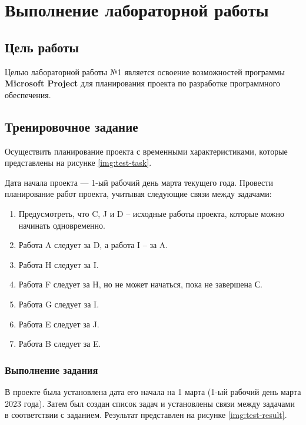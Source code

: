 
\chapter{Выполнение лабораторной работы}


\section{Цель работы}

Целью лабораторной работы №1 является освоение возможностей программы \textbf{Microsoft Project} для планирования проекта по разработке программного обеспечения.



\section{Тренировочное задание}

Осуществить планирование проекта с временными характеристиками, которые представлены на рисунке \ref{img:test-task}.


Дата начала проекта --- 1-ый рабочий день марта текущего года. Провести планирование работ проекта, учитывая следующие связи между задачами:

\begin{enumerate}
    \item Предусмотреть, что C, J и D – исходные работы проекта, которые можно
    начинать одновременно.
    \item Работа A следует за D, а работа I – за A.
    \item Работа H следует за I.
    \item Работа F следует за H, но не может начаться, пока не завершена С.
    \item Работа G следует за I.
    \item Работа E следует за J.
    \item Работа B следует за E.
\end{enumerate}


\subsection{Выполнение задания}

В проекте была установлена дата его начала на 1 марта (1-ый рабочий день марта 2023 года). Затем был создан список задач и установлены связи между задачами в соответствии с заданием. Результат представлен на рисунке \ref{img:test-result}.

